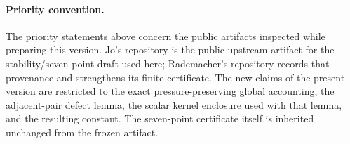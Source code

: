\paragraph{Priority convention.}
The priority statements above concern the public artifacts inspected while
preparing this version. Jo's repository is the public upstream artifact for
the stability/seven-point draft used here; Rademacher's repository records
that provenance and strengthens its finite certificate.  The new claims of
the present version are restricted to the exact pressure-preserving global
accounting, the adjacent-pair defect lemma, the scalar kernel enclosure used
with that lemma, and the resulting constant.  The seven-point certificate
itself is inherited unchanged from the frozen artifact.
